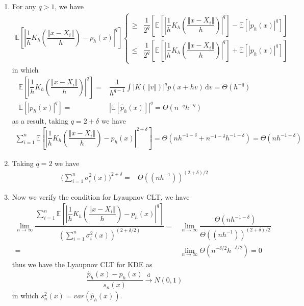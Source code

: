 \documentclass[11pt,a4paper]{ctexart}
\numberwithin{equation}{section}%
\begin{document}
\begin{enumerate}[topsep=2pt,itemsep=2pt]
    \item For any $ q>1 $, we have
    \begin{align*}
        \mathbb{E}\left[ \left\vert \dfrac{ 1 }{ h }  K_h(\dfrac{ \left\Vert x-X_i \right\Vert  }{ h } ) - p_h(x) \right\vert ^q \right] \begin{cases}
            \geq & \dfrac{ 1 }{ 2^q }\left[ \mathbb{E}\left[ \left\vert \dfrac{ 1 }{ h }  K_h(\dfrac{ \left\Vert x-X_i \right\Vert  }{ h } ) \right\vert ^q  \right] - \mathbb{E}\left[ \left\vert p_h(x) \right\vert ^q \right]  \right] \\
            \leq & \dfrac{ 1 }{ 2^q }\left[ \mathbb{E}\left[ \left\vert \dfrac{ 1 }{ h }  K_h(\dfrac{ \left\Vert x-X_i \right\Vert  }{ h } ) \right\vert ^q  \right] + \mathbb{E}\left[ \left\vert p_h(x) \right\vert ^q \right]  \right]
        \end{cases}
    \end{align*}
    in which
    \begin{align*}
        \mathbb{E}\left[ \left\vert \dfrac{ 1 }{ h }  K_h(\dfrac{ \left\Vert x-X_i \right\Vert  }{ h } ) \right\vert ^q  \right] =& \dfrac{ 1 }{ h^{q-1} } \int \left\vert K(\left\Vert v \right\Vert ) \right\vert ^q p(x + hv) \,\mathrm{d}v = \Theta(h^{-q}) \\
        \mathbb{E}\left[ \left\vert p_h(x) \right\vert ^q \right] =& \left\vert \mathbb{E}\left[ \hat{p}_h(x) \right]  \right\vert ^q = \Theta(n^{-q}h^{-q}) 
    \end{align*}
    as a result, taking $ q=2+\delta  $ we have
    \begin{align*}
        \sum_{i=1}^n \mathbb{E}\left[ \left\vert \dfrac{ 1 }{ h }  K_h(\dfrac{ \left\Vert x-X_i \right\Vert  }{ h } ) - p_h(x) \right\vert ^{2+\delta } \right]     = \Theta( n h^{-1-\delta } + n^{-1-\delta }h^{-1-\delta }) = \Theta( n h^{-1-\delta })
    \end{align*}
    \item Taking $ q = 2 $ we have
    \begin{align*}
        \big(\sum_{i=1}^n \sigma _i^2(x))^{2+\delta }=& \Theta ((nh^{-1}))^{(2+\delta )/2}
    \end{align*}
    \item Now we verify the condition for Lyaupnov CLT, we have
    \begin{align*}
        \lim_{n\to\infty } \dfrac{ \sum_{i=1}^n \mathbb{E}\left[ \left\vert \dfrac{ 1 }{ h }  K_h(\dfrac{ \left\Vert x-X_i \right\Vert  }{ h } ) - p_h(x) \right\vert ^q \right] }{ (\sum_{i=1}^n \sigma _i^2(x))^{(2+\delta /2)} }  =& \lim_{n\to\infty } \dfrac{ \Theta( n h^{-1-\delta }) }{ \Theta ((nh^{-1}))^{(2+\delta )/2} } \\
        =&  \lim_{n\to\infty }\Theta ( n^{-\delta /2}  h ^{-\delta /2} ) = 0
    \end{align*}
    thus we have the Lyaupnov CLT for KDE as 
    \begin{align*}
        \dfrac{ \hat{p}_h(x)- p_h(x) }{ s_n(x) } \xrightarrow[]{\mathrm{d}} N(0,1)  
    \end{align*}
    in which $ s_n^2(x) = var(\hat{p}_h(x)) $.


\end{enumerate}
\end{document}
